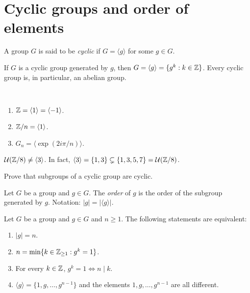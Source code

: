 \section{Cyclic groups and order of elements}
\lecture\label{lec:lagrange}

\begin{definition}
        A group $G$ is said to be \emph{cyclic} if 
        $G=\langle g\rangle$ for some 
        $g\in G$.
\end{definition}

If $G$ is a cyclic group generated by $g$, then 
$G=\langle g\rangle=\{g^k:k\in\mathbb{Z}\}$. Every cyclic group is, 
in particular, an abelian group. 

\begin{example}\
\begin{enumerate}
        \item $\mathbb{Z}=\langle 1\rangle=\langle -1\rangle$.
        \item $\mathbb{Z}/n=\langle 1\rangle$.
        \item $G_n=\langle \exp(2i\pi/n)\rangle$.
\end{enumerate}
\end{example}

\begin{example}
\label{exa:U(Z/8)again}
        $\mathcal{U}(\mathbb{Z}/8)\ne\langle 3\rangle$. 
        In fact, $\langle 3\rangle=\{1,3\}\subsetneq\{1,3,5,7\}=\mathcal{U}(\mathbb{Z}/8)$.
\end{example}

\begin{exercise}
\label{xca:subgroups_cyclic}
        Prove that subgroups of a cyclic group are cyclic.
\end{exercise}

\begin{definition}
        Let $G$ be a group and $g\in G$. The \emph{order} of $g$
        is the order of the subgroup generated by $g$. Notation:
        $|g|=|\langle g\rangle|$.
\end{definition}


\begin{theorem}
        Let $G$ be a group and $g\in G$ and $n\geq1$. 
        The following statements are equivalent:
        \begin{enumerate}
                \item $|g|=n$.
                \item $n=\min\{k\in\mathbb{Z}_{\geq1}:g^k=1\}$.
                \item For every $k\in\mathbb{Z}$, $g^k=1\Longleftrightarrow n\mid k$.
                \item $\langle g\rangle=\{1,g,\dots,g^{n-1}\}$ and 
                the elements $1,g,\dots,g^{n-1}$ are all different.
        \end{enumerate}
\end{theorem}


